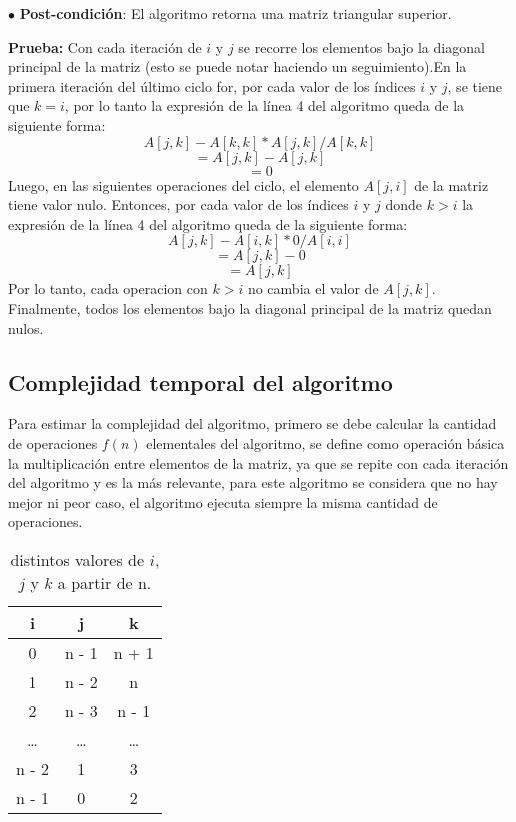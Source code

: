 \documentclass[11pt]{article}
\begin{document}
$\bullet$ \textbf{Post-condición}: El algoritmo retorna una matriz triangular superior.

\textbf{Prueba:} 
Con cada iteración de \(i\) y \(j\) se recorre los elementos bajo la diagonal principal de la matriz (esto se puede notar haciendo un seguimiento).En la primera iteración del último ciclo for, por cada valor de los índices \(i\) y \(j\), se tiene que \(k = i\), por lo tanto la expresión de la línea 4 del algoritmo queda de la siguiente forma:
\[A[j,k] - A[k,k] \ast  A[j,k] / A[k,k] \]
\[=A[j,k] - A[j,k]  \]
\[ = 0  \]
Luego, en las siguientes operaciones del ciclo, el elemento \( A[j,i]  \) de la matriz tiene valor nulo. Entonces, por cada valor de los índices \(i\) y \(j\) donde \( k > i  \) la expresión de la línea 4 del algoritmo queda de la siguiente forma:
\[A[j,k] - A[i,k] \ast  0 / A[i,i] \]
\[= A[j,k] - 0 \]
\[= A[j,k] \]
Por lo tanto, cada operacion con \( k > i  \) no cambia el valor de \(A[j,k]\). Finalmente, todos los elementos bajo la diagonal principal de la matriz quedan nulos.
\subsection{Complejidad temporal del algoritmo}
Para estimar la complejidad del algoritmo, primero se debe calcular la cantidad de operaciones \(f(n)\) elementales del algoritmo, se define como operación básica la multiplicación entre elementos de la matriz, ya que se repite con cada iteración del algoritmo y es la más relevante, para este algoritmo se considera que no hay mejor ni peor caso, el algoritmo ejecuta siempre la misma cantidad de operaciones. 

\begin{table}[h!]
\centering
\begin{tabular}{||c c c||}
\hline 
\textbf{i}  &\textbf{j} & \textbf{k} \\[0.5ex] \hline\hline
0  & n - 1 & n + 1\\ \hline 
1  & n - 2 & n \\ \hline 
2 & n - 3 & n - 1 \\ \hline 
\dots  & \dots & \dots \\ \hline 
n - 2  &1 & 3 \\ \hline 
n - 1  &0 & 2 \\ \hline 
\end{tabular} 
\caption{distintos valores de \(i\),\(j\) y \(k\) a partir de n.}

\end{table}
\end{document}
